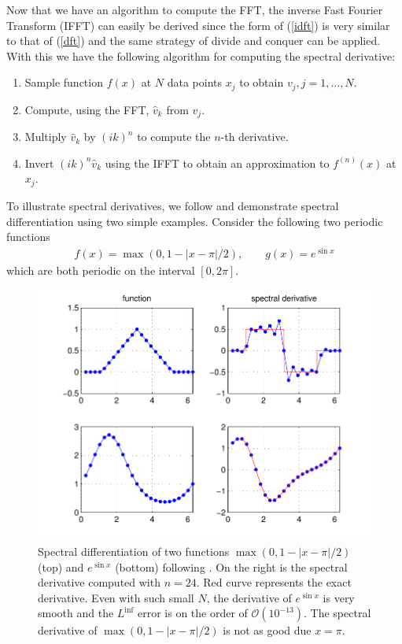Now that we have an algorithm to compute the FFT, the inverse Fast Fourier Transform (IFFT) can easily be derived since the form of (\ref{idft}) is very similar to that of (\ref{dft}) and the same strategy of divide and conquer can be applied. With this we have the following algorithm for computing the spectral derivative:
\begin{enumerate} 
\item Sample function $f(x)$ at $N$ data points $x_{j}$ to obtain $v_{j}, j=1,\ldots,N$.
\item Compute, using the FFT, $\hat{v}_{k}$ from $v_{j}$.
\item Multiply $\hat{v}_{k}$ by $(ik)^{n}$ to compute the $n$-th derivative.
\item Invert $(ik)^{n}\hat{v}_{k}$ using the IFFT  to obtain an approximation to $f^{(n)}(x)$ at $x_{j}$. 
\end{enumerate}

To illustrate spectral derivatives, we follow \cite{trefethen_spectral} and demonstrate spectral differentiation using two simple examples. Consider the following two periodic functions
\begin{align}
f(x) = \max(0,1-|x-\pi|/2), \qquad g(x)=e^{\sin x}
\end{align}
which are both periodic on the interval $[0,2\pi]$. 
\begin{figure}
\begin{center}
\includegraphics[width=\textwidth]{spectral_derivatives.pdf}
\caption{Spectral differentiation of two functions $\max(0,1-|x-\pi|/2)$ (top) and $e^{\sin x}$ (bottom) following \cite{trefethen_spectral}. On the right is the spectral derivative computed with $n=24$. Red curve represents the exact derivative. Even with such small $N$, the derivative of $e^{\sin x}$ is very smooth and the $L^{\inf}$ error is on the order of $\mathcal{O}(10^{-13})$. The spectral derivative of $\max(0,1-|x-\pi|/2)$ is not as good due  $x=\pi$.}
\label{spectral_derivatives}
\end{center}
\end{figure}

